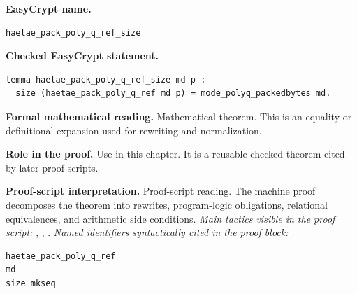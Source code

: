 \begin{formaltheorem}
\noindent\textbf{EasyCrypt name.}
\begin{lstlisting}[language=EasyCrypt,basicstyle=\ttfamily\scriptsize]
haetae_pack_poly_q_ref_size
\end{lstlisting}
\noindent\textbf{Checked EasyCrypt statement.}
\begin{lstlisting}[language=EasyCrypt,basicstyle=\ttfamily\scriptsize]
lemma haetae_pack_poly_q_ref_size md p :
  size (haetae_pack_poly_q_ref md p) = mode_polyq_packedbytes md.
\end{lstlisting}
\noindent\textbf{Formal mathematical reading.}
Mathematical theorem. This is an equality or definitional expansion used for rewriting and normalization.

\noindent\textbf{Role in the proof.}
Use in this chapter. It is a reusable checked theorem cited by later proof scripts.

\noindent\textbf{Proof-script interpretation.}
Proof-script reading. The machine proof decomposes the theorem into rewrites, program-logic obligations, relational equivalences, and arithmetic side conditions.
\emph{Main tactics visible in the proof script:} , , .
\emph{Named identifiers syntactically cited in the proof block:}
\begin{lstlisting}[language=EasyCrypt,basicstyle=\ttfamily\scriptsize]
haetae_pack_poly_q_ref
md
size_mkseq
\end{lstlisting}

\end{formaltheorem}

